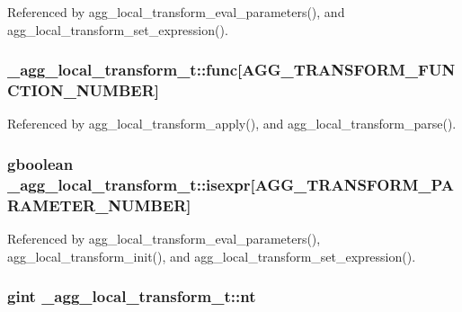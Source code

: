 Referenced by agg\+\_\+local\+\_\+transform\+\_\+eval\+\_\+parameters(), and agg\+\_\+local\+\_\+transform\+\_\+set\+\_\+expression().

\subsubsection[{func}]{ \+\_\+agg\+\_\+local\+\_\+transform\+\_\+t\+::func[{\bf A\+G\+G\+\_\+\+T\+R\+A\+N\+S\+F\+O\+R\+M\+\_\+\+F\+U\+N\+C\+T\+I\+O\+N\+\_\+\+N\+U\+M\+B\+E\+R}]}\label{struct__agg__local__transform__t_ace0e0e41b37ae8835af0b65240cced18}


Referenced by agg\+\_\+local\+\_\+transform\+\_\+apply(), and agg\+\_\+local\+\_\+transform\+\_\+parse().

\subsubsection[{isexpr}]{\setlength{\rightskip}{0pt plus 5cm}gboolean \+\_\+agg\+\_\+local\+\_\+transform\+\_\+t\+::isexpr[{\bf A\+G\+G\+\_\+\+T\+R\+A\+N\+S\+F\+O\+R\+M\+\_\+\+P\+A\+R\+A\+M\+E\+T\+E\+R\+\_\+\+N\+U\+M\+B\+E\+R}]}\label{struct__agg__local__transform__t_a0c6d3aeae61abed95a37e0fa61a1c3b9}


Referenced by agg\+\_\+local\+\_\+transform\+\_\+eval\+\_\+parameters(), agg\+\_\+local\+\_\+transform\+\_\+init(), and agg\+\_\+local\+\_\+transform\+\_\+set\+\_\+expression().

\subsubsection[{nt}]{\setlength{\rightskip}{0pt plus 5cm}gint \+\_\+agg\+\_\+local\+\_\+transform\+\_\+t\+::nt}\label{struct__agg__local__transform__t_a5c953ccdcfd7cb89ab7e4e967664fe2a}


